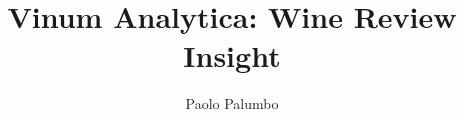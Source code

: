 \documentclass[10pt]{article}
\author{Paolo Palumbo}
\title{Vinum Analytica: Wine Review Insight}
\begin{document}
\maketitle
\begin{multicols}{2}








\end{multicols}



\end{document}
